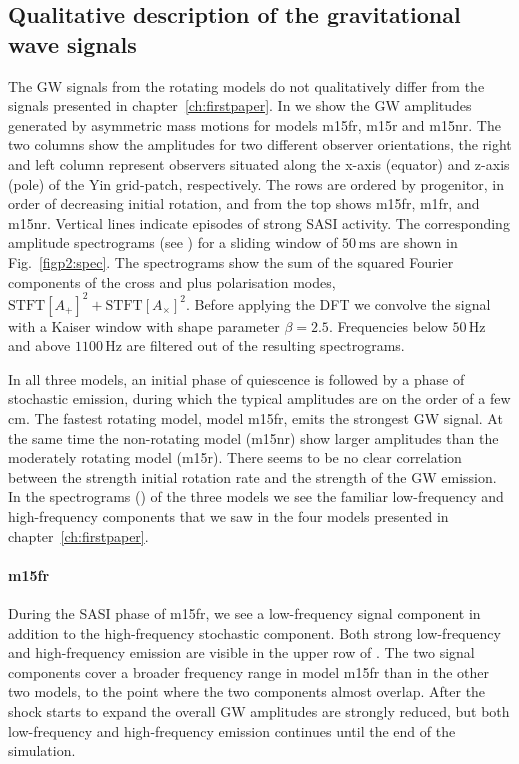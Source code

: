 \subsection{Qualitative description of the gravitational wave signals}
The GW signals from the rotating models do not qualitatively differ from
the signals presented in chapter~\ref{ch:firstpaper}. In  we show the
GW amplitudes generated by asymmetric mass motions for models m15fr, m15r and m15nr.
The two columns show the amplitudes for two different observer orientations,
the right and left column represent observers situated along the x-axis (equator) and z-axis (pole) of the Yin grid-patch,
respectively. The rows are ordered by progenitor, in order of decreasing initial rotation, and from the top
shows m15fr, m1fr, and m15nr. Vertical lines indicate episodes of strong SASI activity.
The corresponding amplitude spectrograms (see ) for a sliding window of $50 \, \mathrm{ms}$ are shown 
in Fig.~\ref{figp2:spec}. The spectrograms show the sum of the squared Fourier
components of the cross and plus polarisation modes,
$\text{STFT}[{A_+}]^2 + \text{STFT}[{A_{\times}}]^2$. Before applying the
DFT we convolve the signal with a Kaiser window with shape parameter $\beta = 2.5$. Frequencies
below $50 \, \mathrm{Hz}$ and above $1100  \, \mathrm{Hz}$ are filtered out of the resulting spectrograms. 

In all three models, an initial phase of quiescence is followed by a phase of stochastic emission, 
during which the typical amplitudes are on the order of a few cm. The fastest rotating model, model m15fr, 
emits the strongest GW signal. 
At the same time the non-rotating model (m15nr) show larger amplitudes than the moderately rotating model (m15r).
There seems to be no clear correlation between the strength initial rotation rate and the strength of the GW emission. 
In the spectrograms () of the three models we see the familiar low-frequency and high-frequency 
components that we saw in the four models presented in chapter~\ref{ch:firstpaper}.

\paragraph{m15fr}
During the SASI phase of m15fr, we see a low-frequency signal 
component in addition to the high-frequency stochastic component. Both strong low-frequency and high-frequency
emission are visible in the upper row of . The two signal components
cover a broader frequency range in model m15fr than in the other two models, to the point where the two components almost
overlap. After the shock starts to expand the overall GW amplitudes are strongly reduced, but
both low-frequency and high-frequency emission continues until the end of the simulation.

